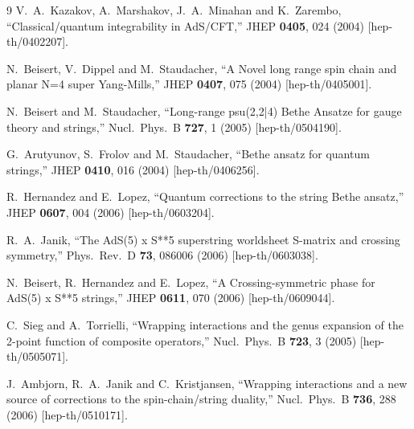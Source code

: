 \documentclass[a4paper,11pt]{article}
\numberwithin{equation}{section}
\begin{document}
\begin{thebibliography} {9}
  V.~A.~Kazakov, A.~Marshakov, J.~A.~Minahan and K.~Zarembo,
  ``Classical/quantum integrability in AdS/CFT,''
  JHEP {\bf 0405}, 024 (2004)
  [hep-th/0402207].

  N.~Beisert, V.~Dippel and M.~Staudacher,
  ``A Novel long range spin chain and planar N=4 super Yang-Mills,''
  JHEP {\bf 0407}, 075 (2004)
  [hep-th/0405001].

  N.~Beisert and M.~Staudacher,
  ``Long-range psu(2,2|4) Bethe Ansatze for gauge theory and strings,''
  Nucl.\ Phys.\ B {\bf 727}, 1 (2005)
  [hep-th/0504190].

  G.~Arutyunov, S.~Frolov and M.~Staudacher,
  ``Bethe ansatz for quantum strings,''
  JHEP {\bf 0410}, 016 (2004)
  [hep-th/0406256].

  R.~Hernandez and E.~Lopez,
  ``Quantum corrections to the string Bethe ansatz,''
  JHEP {\bf 0607}, 004 (2006)
  [hep-th/0603204].

  R.~A.~Janik,
  ``The AdS(5) x S**5 superstring worldsheet S-matrix and crossing symmetry,''
  Phys.\ Rev.\ D {\bf 73}, 086006 (2006)
  [hep-th/0603038].

  N.~Beisert, R.~Hernandez and E.~Lopez,
  ``A Crossing-symmetric phase for AdS(5) x S**5 strings,''
  JHEP {\bf 0611}, 070 (2006)
  [hep-th/0609044].

  C.~Sieg and A.~Torrielli,
  ``Wrapping interactions and the genus expansion of the 2-point function of composite operators,''
  Nucl.\ Phys.\ B {\bf 723}, 3 (2005)
  [hep-th/0505071].

  J.~Ambjorn, R.~A.~Janik and C.~Kristjansen,
  ``Wrapping interactions and a new source of corrections to the spin-chain/string duality,''
  Nucl.\ Phys.\ B {\bf 736}, 288 (2006)
  [hep-th/0510171].


\end{thebibliography}
\end{document}
